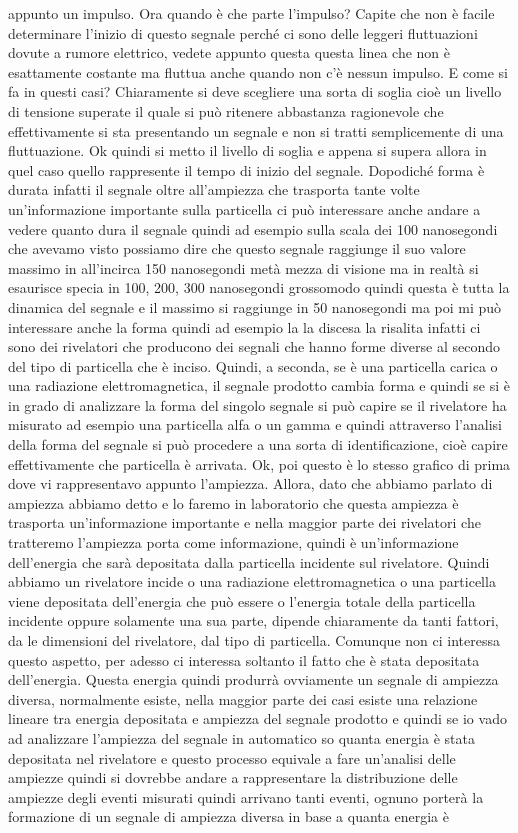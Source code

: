 appunto un impulso. Ora quando è che parte l'impulso? Capite che non è facile determinare l'inizio di questo segnale perché ci sono delle leggeri fluttuazioni dovute a rumore elettrico, vedete appunto questa questa linea che non è esattamente costante ma fluttua anche quando non c'è nessun impulso. E come si fa in questi casi? Chiaramente si deve scegliere una sorta di soglia cioè un livello di tensione superate il quale si può ritenere abbastanza ragionevole che effettivamente si sta presentando un segnale e non si tratti semplicemente di una fluttuazione. Ok quindi si metto il livello di soglia e appena si supera allora in quel caso quello rappresente il tempo di inizio del segnale. Dopodiché forma è durata infatti il segnale oltre all'ampiezza che trasporta tante volte un'informazione importante sulla particella ci può interessare anche andare a vedere quanto dura il segnale quindi ad esempio sulla scala dei 100 nanosegondi che avevamo visto possiamo dire che questo segnale raggiunge il suo valore massimo in all'incirca 150 nanosegondi metà mezza di visione ma in realtà si esaurisce specia in 100, 200, 300 nanosegondi grossomodo quindi questa è tutta la dinamica del segnale e il massimo si raggiunge in 50 nanosegondi ma poi mi può interessare anche la forma quindi ad esempio la la discesa la risalita infatti ci sono dei rivelatori che producono dei segnali che hanno forme diverse al secondo del tipo di particella che è inciso. Quindi, a seconda, se è una particella carica o una radiazione elettromagnetica, il segnale prodotto cambia forma e quindi se si è in grado di analizzare la forma del singolo segnale si può capire se il rivelatore ha misurato ad esempio una particella alfa o un gamma e quindi attraverso l'analisi della forma del segnale si può procedere a una sorta di identificazione, cioè capire effettivamente che particella è arrivata. Ok, poi questo è lo stesso grafico di prima dove vi rappresentavo appunto l'ampiezza. Allora, dato che abbiamo parlato di ampiezza abbiamo detto e lo faremo in laboratorio che questa ampiezza è trasporta un'informazione importante e nella maggior parte dei rivelatori che tratteremo l'ampiezza porta come informazione, quindi è un'informazione dell'energia che sarà depositata dalla particella incidente sul rivelatore. Quindi abbiamo un rivelatore incide o una radiazione elettromagnetica o una particella viene depositata dell'energia che può essere o l'energia totale della particella incidente oppure solamente una sua parte, dipende chiaramente da tanti fattori, da le dimensioni del rivelatore, dal tipo di particella. Comunque non ci interessa questo aspetto, per adesso ci interessa soltanto il fatto che è stata depositata dell'energia. Questa energia quindi produrrà ovviamente un segnale di ampiezza diversa, normalmente esiste, nella maggior parte dei casi esiste una relazione lineare tra energia depositata e ampiezza del segnale prodotto e quindi se io vado ad analizzare l'ampiezza del segnale in automatico so quanta energia è stata depositata nel rivelatore e questo processo equivale a fare un'analisi delle ampiezze quindi si dovrebbe andare a rappresentare la distribuzione delle ampiezze degli eventi misurati quindi arrivano tanti eventi, ognuno porterà la formazione di un segnale di ampiezza diversa in base a quanta energia è 